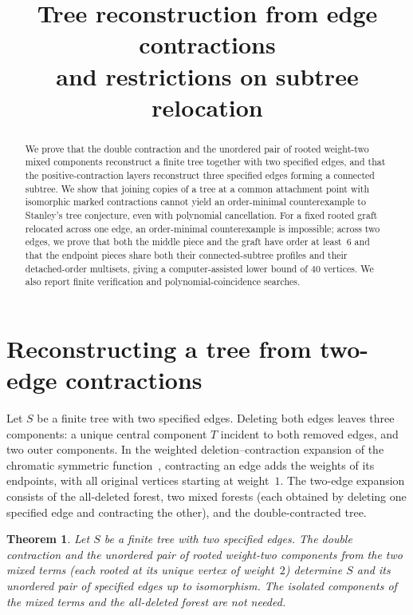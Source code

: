 \documentclass[10pt]{article}
\title{Tree reconstruction from edge contractions\\ and restrictions on subtree relocation}
\author{}
\date{}
\newtheorem{theorem}{Theorem}[section]
\begin{document}
\maketitle
\vspace{-2.5em}

\begin{abstract}
We prove that the double contraction and the unordered pair of rooted weight-two mixed components reconstruct a finite tree together with two specified edges, and that the positive-contraction layers reconstruct three specified edges forming a connected subtree. We show that joining copies of a tree at a common attachment point with isomorphic marked contractions cannot yield an order-minimal counterexample to Stanley's tree conjecture, even with polynomial cancellation. For a fixed rooted graft relocated across one edge, an order-minimal counterexample is impossible; across two edges, we prove that both the middle piece and the graft have order at least~$6$ and that the endpoint pieces share both their connected-subtree profiles and their detached-order multisets, giving a computer-assisted lower bound of $40$ vertices. We also report finite verification and polynomial-coincidence searches.
\end{abstract}

\section{Reconstructing a tree from two-edge contractions}

Let $S$ be a finite tree with two specified edges. Deleting both edges leaves three components: a unique central component $T$ incident to both removed edges, and two outer components. In the weighted deletion--contraction expansion of the chromatic symmetric function~\cite{crew-spirkl}, contracting an edge adds the weights of its endpoints, with all original vertices starting at weight~$1$. The two-edge expansion consists of the all-deleted forest, two mixed forests (each obtained by deleting one specified edge and contracting the other), and the double-contracted tree.

\begin{theorem}\label{thm:two-edge}
Let $S$ be a finite tree with two specified edges. The double contraction and the unordered pair of rooted weight-two components from the two mixed terms (each rooted at its unique vertex of weight~$2$) determine $S$ and its unordered pair of specified edges up to isomorphism. The isolated components of the mixed terms and the all-deleted forest are not needed.
\end{theorem}
\end{document}
